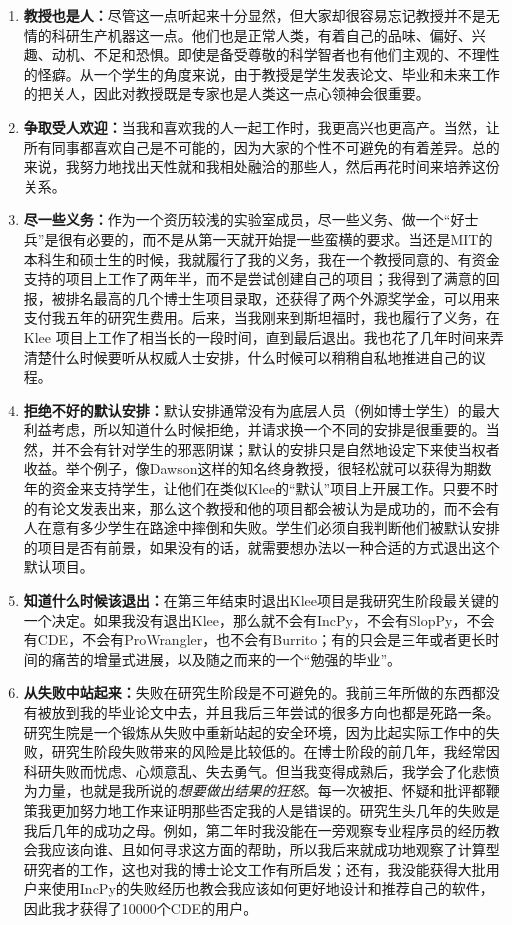 \documentclass[letter,12pt]{book}
\begin{document}
\begin{CJK}{UTF8}{gbsn}
\begin{enumerate}
  \item \textbf{教授也是人：}尽管这一点听起来十分显然，但大家却很容易忘记教授并不是无情的科研生产机器这一点。他们也是正常人类，有着自己的品味、偏好、兴趣、动机、不足和恐惧。即使是备受尊敬的科学智者也有他们主观的、不理性的怪癖。从一个学生的角度来说，由于教授是学生发表论文、毕业和未来工作的把关人，因此对教授既是专家也是人类这一点心领神会很重要。
  \item \textbf{争取受人欢迎：}当我和喜欢我的人一起工作时，我更高兴也更高产。当然，让所有同事都喜欢自己是不可能的，因为大家的个性不可避免的有着差异。总的来说，我努力地找出天性就和我相处融洽的那些人，然后再花时间来培养这份关系。
  \item \textbf{尽一些义务：}作为一个资历较浅的实验室成员，尽一些义务、做一个“好士兵”是很有必要的，而不是从第一天就开始提一些蛮横的要求。当还是MIT的本科生和硕士生的时候，我就履行了我的义务，我在一个教授同意的、有资金支持的项目上工作了两年半，而不是尝试创建自己的项目；我得到了满意的回报，被排名最高的几个博士生项目录取，还获得了两个外源奖学金，可以用来支付我五年的研究生费用。后来，当我刚来到斯坦福时，我也履行了义务，在Klee 项目上工作了相当长的一段时间，直到最后退出。我也花了几年时间来弄清楚什么时候要听从权威人士安排，什么时候可以稍稍自私地推进自己的议程。
  \item \textbf{拒绝不好的默认安排：}默认安排通常没有为底层人员（例如博士学生）的最大利益考虑，所以知道什么时候拒绝，并请求换一个不同的安排是很重要的。当然，并不会有针对学生的邪恶阴谋；默认的安排只是自然地设定下来使当权者收益。举个例子，像Dawson这样的知名终身教授，很轻松就可以获得为期数年的资金来支持学生，让他们在类似Klee的“默认”项目上开展工作。只要不时的有论文发表出来，那么这个教授和他的项目都会被认为是成功的，而不会有人在意有多少学生在路途中摔倒和失败。学生们必须自我判断他们被默认安排的项目是否有前景，如果没有的话，就需要想办法以一种合适的方式退出这个默认项目。
  \item \textbf{知道什么时候该退出：}在第三年结束时退出Klee项目是我研究生阶段最关键的一个决定。如果我没有退出Klee，那么就不会有IncPy，不会有SlopPy，不会有CDE，不会有ProWrangler，也不会有Burrito；有的只会是三年或者更长时间的痛苦的增量式进展，以及随之而来的一个“勉强的毕业”。
  \item \textbf{从失败中站起来：}失败在研究生阶段是不可避免的。我前三年所做的东西都没有被放到我的毕业论文中去，并且我后三年尝试的很多方向也都是死路一条。研究生院是一个锻炼从失败中重新站起的安全环境，因为比起实际工作中的失败，研究生阶段失败带来的风险是比较低的。在博士阶段的前几年，我经常因科研失败而忧虑、心烦意乱、失去勇气。但当我变得成熟后，我学会了化悲愤为力量，也就是我所说的\emph{想要做出结果的狂怒}。每一次被拒、怀疑和批评都鞭策我更加努力地工作来证明那些否定我的人是错误的。研究生头几年的失败是我后几年的成功之母。例如，第二年时我没能在一旁观察专业程序员的经历教会我应该向谁、且如何寻求这方面的帮助，所以我后来就成功地观察了计算型研究者的工作，这也对我的博士论文工作有所启发；还有，我没能获得大批用户来使用IncPy的失败经历也教会我应该如何更好地设计和推荐自己的软件，因此我才获得了10000个CDE的用户。

\end{enumerate}
\end{CJK}
\end{document}
